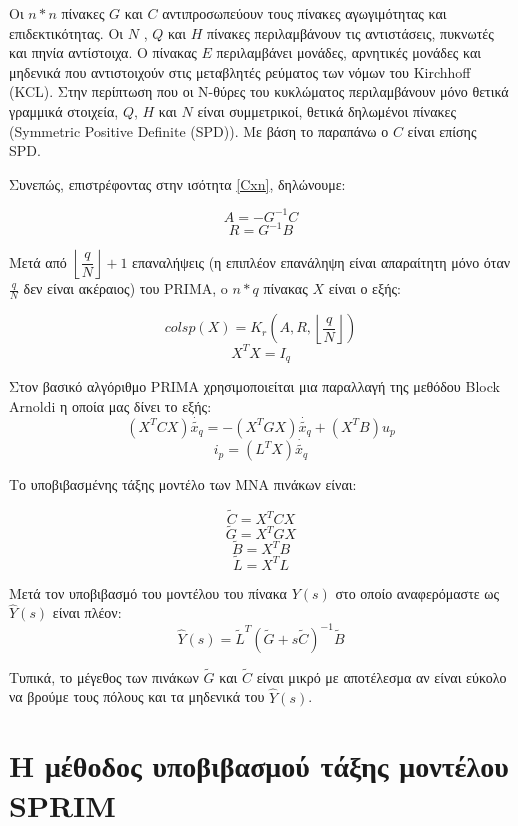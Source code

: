 Οι $n * n$ πίνακες $G$ και $C$ αντιπροσωπεύουν τους πίνακες αγωγιμότητας και επιδεκτικότητας. Οι $N$
, $Q$ και $H$ πίνακες περιλαμβάνουν τις αντιστάσεις, πυκνωτές και πηνία αντίστοιχα. Ο πίνακας $E$ περιλαμβάνει μονάδες, αρνητικές μονάδες και μηδενικά που αντιστοιχούν στις μεταβλητές ρεύματος των νόμων του  \textlatin{Kirchhoff (KCL)}. Στην περίπτωση που οι N-θύρες του κυκλώματος περιλαμβάνουν μόνο θετικά γραμμικά στοιχεία, $Q$, $H$ και $N$ είναι συμμετρικοί, θετικά δηλωμένοι πίνακες (\textlatin{Symmetric Positive Definite (SPD)}). Με βάση το παραπάνω ο $C$ είναι επίσης \textlatin{SPD}. 

Συνεπώς, επιστρέφοντας στην ισότητα \ref{Cxn}, δηλώνουμε:

\begin{equation}
    A = -G^{-1}C
\end{equation}
\begin{equation}
    R = G^{-1}B
\end{equation}


Μετά από $\left\lfloor\dfrac{q}{N}\right\rfloor +1$ επαναλήψεις (η επιπλέον επανάληψη είναι απαραίτητη μόνο όταν $\frac{q}{N}$ δεν είναι ακέραιος) του \textlatin{PRIMA}, o $n * q$ πίνακας $X$ είναι ο εξής:

\[
    colsp(X) = K_r(A, R,\left\lfloor\dfrac{q}{N}\right\rfloor)
\]
\[
    X^T X = I_q
\]

Στον βασικό αλγόριθμο \textlatin{PRIMA} χρησιμοποιείται μια παραλλαγή της μεθόδου \textlatin{Block Arnoldi} η οποία μας δίνει το εξής:
\[
    (X^T C X)\dot{\widetilde{x_q}} = - (X^T G X)\dot{\widetilde{x_q}} + (X^T B)u_p
\]
\[
    i_p = (L^TX)\dot{\widetilde{x_q}}
\]

Το υποβιβασμένης τάξης μοντέλο των \textlatin{MNA} πινάκων είναι:

\[
    \widetilde{C} = X^T C X
\]
\[
    \widetilde{G} = X^T G X
\]
\[
    \widetilde{B} = X^T B
\]
\[
    \widetilde{L} = X^T L
\]

Μετά τον υποβιβασμό του μοντέλου του πίνακα $Y(s)$ στο οποίο αναφερόμαστε ως $\hat{Y}(s)$ είναι πλέον:
\[
    \hat{Y}(s) = \widetilde{L}^T (\widetilde{G} + s \widetilde{C})^{-1} \widetilde{B}
\]

Τυπικά, το μέγεθος των πινάκων $\widetilde{G}$ και $\widetilde{C}$ είναι μικρό με αποτέλεσμα αν είναι εύκολο να βρούμε τους πόλους και τα μηδενικά του $\hat{Y}(s)$.

\section{Η μέθοδος υποβιβασμού τάξης μοντέλου \textlatin{SPRIM}}

